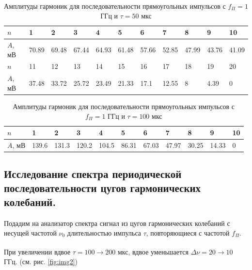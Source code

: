 \documentclass[a4paper,12pt]{article} %
\begin{document}
\begin{table}[h]
\begin{center}
\begin{tabularx}{\textwidth}{|l|Y|Y|Y|Y|Y|Y|Y|Y|Y|Y|}
\hline
$n$ & 1 & 2 & 3 & 4 & 5 &6 & 7 & 8 & 9 & 10 \\ \hline
$A$, мВ & 70.89 & 69.48 & 67.44 & 64.93 & 61.48 & 57.66 & 52.85 & 47.99 & 43.76 & 41.09 \\ \hline
$n$ & 11 & 12 & 13 & 14 & 15 & 16 & 17 & 18 & 19 & 20 \\ \hline
$A$, мВ & 37.48 & 33.72 & 25.72 & 23.49 & 21.33 & 17.1 & 12.55 & 8 & 4.39 & 0 \\ \hline
\end{tabularx}
\caption{Амплитуды гармоник для последовательности прямоугольных импульсов с $f_\Pi = 1$ ГГц и $\tau = 50$ мкс}
\end{center}
\end{table}

\begin{table}[h]
\begin{center}
\begin{tabularx}{\textwidth}{|l|Y|Y|Y|Y|Y|Y|Y|Y|Y|Y|}
\hline
$n$ & 1 & 2 & 3 & 4 & 5 &6 & 7 & 8 & 9 & 10 \\ \hline
$A$, мВ & 139.6 & 131.3 & 120.2 & 104.5 & 86.31 & 67.03 & 47.97 & 30.25 & 14.33 & 0 \\ \hline
\end{tabularx}
\caption{Амплитуды гармоник для последовательности прямоугольных импульсов с $f_\Pi = 1$ ГГц и $\tau = 100$ мкс}
\end{center}
\end{table}

\subsection{Исследование спектра периодической последовательности цугов гармонических колебаний.}

\paragraph{} Подадим на анализатор спектра сигнал из цугов гармонических колебаний с несущей частотой $\nu_0$ длительностью импульса $\tau$, повторяющиеся с частотой $f_\Pi$.

\paragraph{} При увеличении вдвое $\tau = 100 \rightarrow 200$ мкс, вдвое уменьшается $\Delta \nu = 20 \rightarrow 10$ ГГц. (см. рис. \ref{fig:img2})
\end{document}
